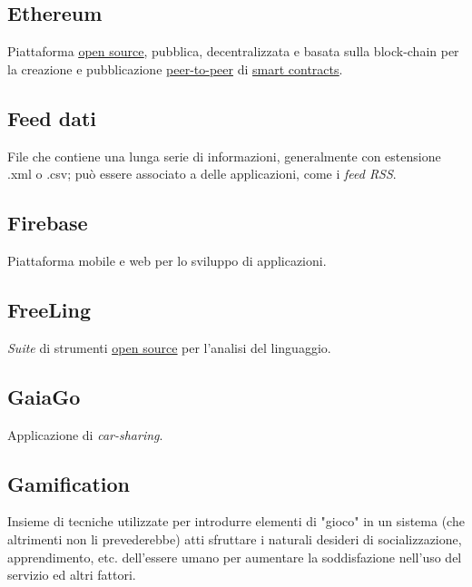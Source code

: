 	\subsection{Ethereum}
	\label{sec:ethereum}
	Piattaforma \underline{\hyperref[sec:opensource]{open source}}, pubblica, decentralizzata e basata sulla block-chain per la creazione e pubblicazione \underline{\hyperref[sec:p2p]{peer-to-peer}} di \underline{\hyperref[sec:smartcontracts]{smart contracts}}.

	\newpage

	\subsection{Feed dati}
	\label{sec:feeddati}
	File che contiene una lunga serie di informazioni, generalmente con estensione .xml o .csv; può essere associato a delle applicazioni, come i \emph{feed RSS}.

	\subsection{Firebase}
	\label{sec:firebase}
	Piattaforma mobile e web per lo sviluppo di applicazioni.

	\subsection{FreeLing}
	\label{sec:freeling}
	\emph{Suite} di strumenti \underline{\hyperref[sec:opensource]{open source}} per l'analisi del linguaggio.

	\newpage


	\subsection{GaiaGo}
	\label{sec:gaiago}
	Applicazione di \emph{car-sharing}.

	\subsection{Gamification}
	\label{sec:gamification}
	Insieme di tecniche utilizzate per introdurre elementi di "gioco" in un sistema (che altrimenti non li prevederebbe) atti sfruttare i naturali desideri di socializzazione, apprendimento, etc. dell'essere umano per aumentare la soddisfazione nell'uso del servizio ed altri fattori.

